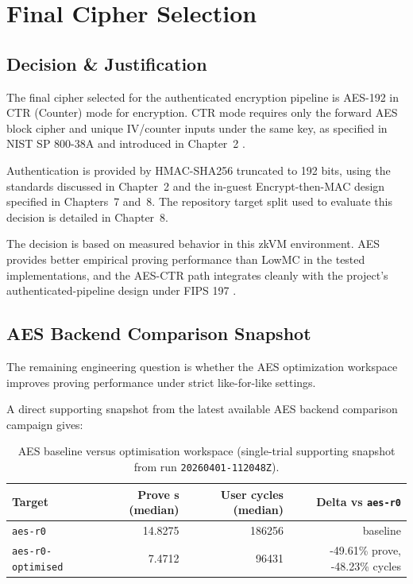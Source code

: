 \chapter{Final Cipher Selection}

\section{Decision \& Justification}

The final cipher selected for the authenticated encryption pipeline is
AES-192 in CTR (Counter) mode for encryption. CTR mode requires only the forward
AES block cipher and unique IV/counter inputs under the same key, as specified in
NIST SP 800-38A and introduced in Chapter~2 \cite{nistsp80038a}.

Authentication is provided by HMAC-SHA256 truncated to 192 bits, using the
standards discussed in Chapter~2 and the in-guest Encrypt-then-MAC design
specified in Chapters~7 and~8. The repository target split used to evaluate this
decision is detailed in Chapter~8.

The decision is based on measured behavior in this zkVM environment. AES
provides better empirical proving performance than LowMC in the tested
implementations, and the AES-CTR path integrates cleanly with the project's
authenticated-pipeline design under FIPS 197 \cite{nistfips197}.


\section{AES Backend Comparison Snapshot}

The remaining engineering question is whether the AES optimization workspace
improves proving performance under strict like-for-like settings.

A direct supporting snapshot from the latest available AES backend comparison
campaign gives:

\begin{table}[H]
\centering
\reporttablesetup
\begin{tabular*}{\textwidth}{@{\extracolsep{\fill}}lrrr@{}}
\hline
Target & Prove s (median) & User cycles (median) & Delta vs \texttt{aes-r0} \\
\hline
\texttt{aes-r0} & 14.8275 & 186256 & baseline \\
\texttt{aes-r0-optimised} & 7.4712 & 96431 & -49.61\% prove, -48.23\% cycles \\
\hline
\end{tabular*}
\caption{AES baseline versus optimisation workspace (single-trial supporting
snapshot from run \texttt{20260401-112048Z}).}
\label{tab:aes-backend-snapshot}
\end{table}

